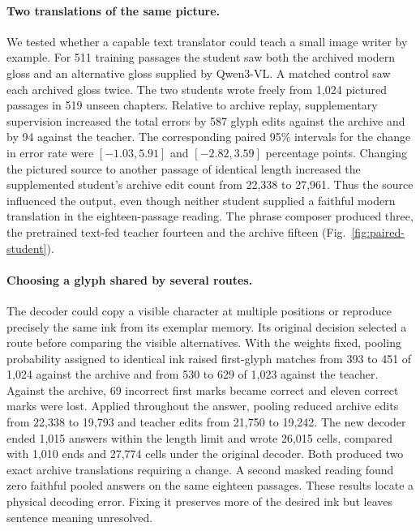 \paragraph{Two translations of the same picture.}
We tested whether a capable text translator could teach a small image writer by example. For 511 training passages the student saw both the archived modern gloss and an alternative gloss supplied by Qwen3-VL. A matched control saw each archived gloss twice. The two students wrote freely from 1,024 pictured passages in 519 unseen chapters. Relative to archive replay, supplementary supervision increased the total errors by 587 glyph edits against the archive and by 94 against the teacher. The corresponding paired 95\% intervals for the change in error rate were $[-1.03,5.91]$ and $[-2.82,3.59]$ percentage points. Changing the pictured source to another passage of identical length increased the supplemented student's archive edit count from 22,338 to 27,961. Thus the source influenced the output, even though neither student supplied a faithful modern translation in the eighteen-passage reading. The phrase composer produced three, the pretrained text-fed teacher fourteen and the archive fifteen (Fig.~\ref{fig:paired-student}).

\paragraph{Choosing a glyph shared by several routes.}
The decoder could copy a visible character at multiple positions or reproduce precisely the same ink from its exemplar memory. Its original decision selected a route before comparing the visible alternatives. With the weights fixed, pooling probability assigned to identical ink raised first-glyph matches from 393 to 451 of 1,024 against the archive and from 530 to 629 of 1,023 against the teacher. Against the archive, 69 incorrect first marks became correct and eleven correct marks were lost. Applied throughout the answer, pooling reduced archive edits from 22,338 to 19,793 and teacher edits from 21,750 to 19,242. The new decoder ended 1,015 answers within the length limit and wrote 26,015 cells, compared with 1,010 ends and 27,774 cells under the original decoder. Both produced two exact archive translations requiring a change. A second masked reading found zero faithful pooled answers on the same eighteen passages. These results locate a physical decoding error. Fixing it preserves more of the desired ink but leaves sentence meaning unresolved.
